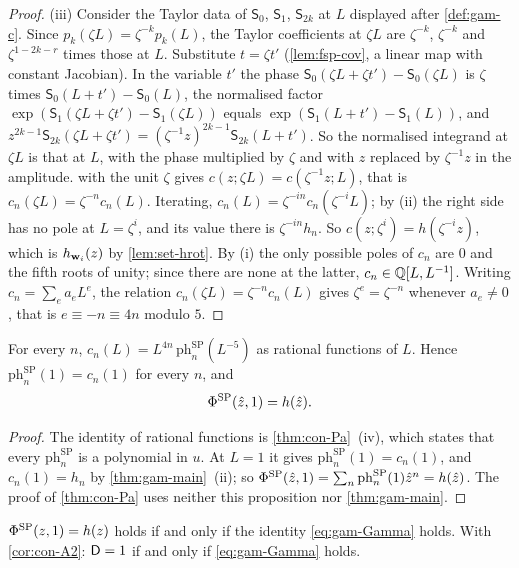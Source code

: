 \begin{proof}
(iii) Consider the Taylor data of $\mathsf S_0$, $\mathsf S_1$, $\mathsf S_{2k}$ at $L$ displayed after \cref{def:gam-c}. Since $p_k(\zeta L)=\zeta^{-k}p_k(L)$, the Taylor coefficients at $\zeta L$ are $\zeta^{-k}$, $\zeta^{-k}$ and $\zeta^{1-2k-r}$ times those at $L$. Substitute $t=\zeta t'$ (\cref{lem:fsp-cov}, a linear map with constant Jacobian). In the variable $t'$ the phase $\mathsf S_0(\zeta L+\zeta t')-\mathsf S_0(\zeta L)$ is $\zeta$ times $\mathsf S_0(L+t')-\mathsf S_0(L)$, the normalised factor $\exp(\mathsf S_1(\zeta L+\zeta t')-\mathsf S_1(\zeta L))$ equals $\exp(\mathsf S_1(L+t')-\mathsf S_1(L))$, and $z^{2k-1}\mathsf S_{2k}(\zeta L+\zeta t')=(\zeta^{-1}z)^{2k-1}\mathsf S_{2k}(L+t')$. So the normalised integrand at $\zeta L$ is that at $L$, with the phase multiplied by $\zeta$ and with $z$ replaced by $\zeta^{-1}z$ in the amplitude.  with the unit $\zeta$ gives $c(z;\zeta L)=c(\zeta^{-1}z;L)$, that is $c_n(\zeta L)=\zeta^{-n}c_n(L)$. Iterating, $c_n(L)=\zeta^{-in}c_n(\zeta^{-i}L)$; by (ii) the right side has no pole at $L=\zeta^i$, and its value there is $\zeta^{-in}h_n$. So $c(z;\zeta^i)=h(\zeta^{-i}z)$, which is $h_{\mathbf{w}_i}(z)$ by \cref{lem:set-hrot}. By (i) the only possible poles of $c_n$ are $0$ and the fifth roots of unity; since there are none at the latter, $c_n\in\mathbb{Q}[L,L^{-1}]$. Writing $c_n=\sum_ea_eL^e$, the relation $c_n(\zeta L)=\zeta^{-n}c_n(L)$ gives $\zeta^e=\zeta^{-n}$ whenever $a_e\neq 0$, that is $e\equiv -n\equiv 4n$ modulo $5$.
\end{proof}

\begin{prop}
\label{prop:gam-hatflat}
For every $n$, $c_n(L)=L^{4n}\,\mathrm{ph}^{\mathrm{SP}}_n(L^{-5})$ as rational functions of $L$. Hence $\mathrm{ph}^{\mathrm{SP}}_n(1)=c_n(1)$ for every $n$, and
\[
\Phi^{\mathrm{SP}}(\hat{z},1)=h(\hat{z}).
\]
\end{prop}

\begin{proof}
The identity of rational functions is \cref{thm:con-Pa}~(iv), which states that every $\mathrm{ph}^{\mathrm{SP}}_n$ is a polynomial in $u$. At $L=1$ it gives $\mathrm{ph}^{\mathrm{SP}}_n(1)=c_n(1)$, and $c_n(1)=h_n$ by \cref{thm:gam-main}~(ii); so $\Phi^{\mathrm{SP}}(\hat{z},1)=\sum_n\mathrm{ph}^{\mathrm{SP}}_n(1)\hat{z}^n=h(\hat{z})$. The proof of \cref{thm:con-Pa} uses neither this proposition nor \cref{thm:gam-main}.
\end{proof}

\begin{cor}
\label{cor:gam-equiv}
$\Phi^{\mathrm{SP}}(z,1)=h(z)$ holds if and only if the identity \eqref{eq:gam-Gamma} holds. With \cref{cor:con-A2}: $\mathsf{D}=1$ if and only if \eqref{eq:gam-Gamma} holds.
\end{cor}

